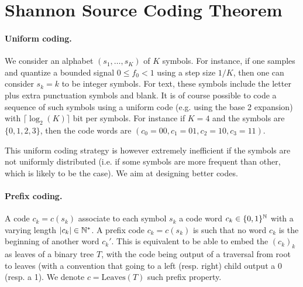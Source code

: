 
\section{Shannon Source Coding Theorem}
\label{sec-shannon-source}

\newcommand{\Symb}{s}

\paragraph{Uniform coding.}

We consider an alphabet $(\Symb_1,\ldots,\Symb_K)$ of $K$ symbols. For instance, if one samples and quantize a bounded signal $0 \leq f_0 < 1$ using a step size $1/K$, then one can consider $\Symb_k=k$ to be integer symbols. For text, these symbols include the letter plus extra punctuation symbols and blank. 
%
It is of course possible to code a sequence of such symbols using a uniform code (e.g. using the base 2 expansion) with $\lceil \log_2(K) \rceil$ bit per symbols.
For instance if $K=4$ and the symbols are $\{0,1,2,3\}$, then the code words are $(c_0=00,c_1=01,c_2=10,c_3=11)$. 

This uniform coding strategy is however extremely inefficient if the symbols are not uniformly distributed (i.e. if some symbols are more frequent than other, which is likely to be the case). We aim at designing better codes.

\paragraph{Prefix coding.}
 

A code $c_k=c(\Symb_k)$ associate to each symbol $\Symb_k$ a code word $c_k \in \{0,1\}^{\mathbb{N}}$ with a varying length $|c_k| \in \mathbb{N}^*$. 
%
A prefix code $c_k=c(\Symb_k)$ is such that no word $c_k$ is the beginning of another word $c_k'$. This is equivalent to be able to embed the $(c_k)_k$ as leaves of a binary tree $T$, with the code being output of a traversal from root to leaves (with a convention that going to a left (resp. right) child output a 0 (resp. a 1). 
%
We denote $c=\text{Leaves}(T)$ such prefix property. 



